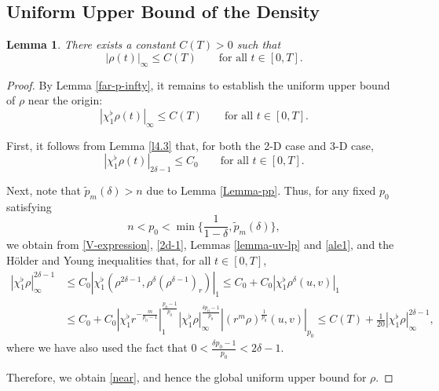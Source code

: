 \documentclass[11pt,reqno]{amsart}
\newtheorem{lem}{Lemma}[section]
\numberwithin{rk}{section}
\numberwithin{prop}{section}
\numberwithin{mydef}{section}
\numberwithin{lem}{section}
\numberwithin{equation}{section}
\numberwithin{thm}{section}
\begin{document}
\subsection{Uniform Upper Bound of the Density}
\begin{lem}\label{important2}
There exists a constant $C(T)>0$ such that
\begin{equation*}
|\rho(t)|_\infty\leq C(T)  \qquad \text{for all $t\in[0,T]$}.
\end{equation*}
\end{lem}
\begin{proof}
By Lemma \ref{far-p-infty}, it remains to establish the uniform upper bound of $\rho$ near the origin:
\begin{equation}\label{near}
|\chi_1^\flat \rho(t)|_\infty \leq C(T) \qquad \text{for all $t\in [0,T]$}.
\end{equation}


First, it follows from Lemma \ref{l4.3} that, for both the 2-D case and 3-D case,
\begin{equation}\label{2d-1}
|\chi_1^\flat \rho(t)|_{2\delta-1}\leq C_0 \qquad\text{for all $t\in [0,T]$}.
\end{equation}

Next, note that $\tilde{p}_{m}(\delta)>n$ due to Lemma \ref{Lemma-pp}. Thus, for any fixed $p_0$ satisfying
\begin{equation*}
n<p_0<\min\big\{\frac{1}{1-\delta},\tilde{p}_{m}(\delta)\big\},
\end{equation*}
we obtain from \eqref{V-expression}, \eqref{2d-1}, Lemmas  \ref{lemma-uv-lp} and \ref{ale1}, and the H\"older and Young inequalities that, for all $t\in [0,T]$,
\begin{equation*}
\begin{aligned}
|\chi_1^\flat \rho|_\infty^{2\delta-1}&\leq  C_0|\chi_1^\flat (\rho^{2\delta-1},\rho^\delta(\rho^{\delta-1})_r)|_1 \leq  C_0+C_0|\chi_1^\flat\rho^{\delta} (u,v)|_1\\
&\leq  C_0+C_0|\chi_1^\flat r^{-\frac{m}{p_0-1}}|_1^\frac{p_0-1}{p_0}|\chi_1^\flat\rho|_\infty^\frac{\delta p_0-1}{p_0}|(r^m\rho)^\frac{1}{p_0}(u,v)|_{p_0}\leq C(T)+\frac{1}{20}|\chi_1^\flat \rho|_\infty^{2\delta-1},
\end{aligned}
\end{equation*}
where we have also used the fact that $0<\frac{\delta p_0-1}{p_0}<2\delta-1$.


Therefore, we obtain \eqref{near}, and hence the global uniform upper bound for $\rho$.
\end{proof}
\end{document}
